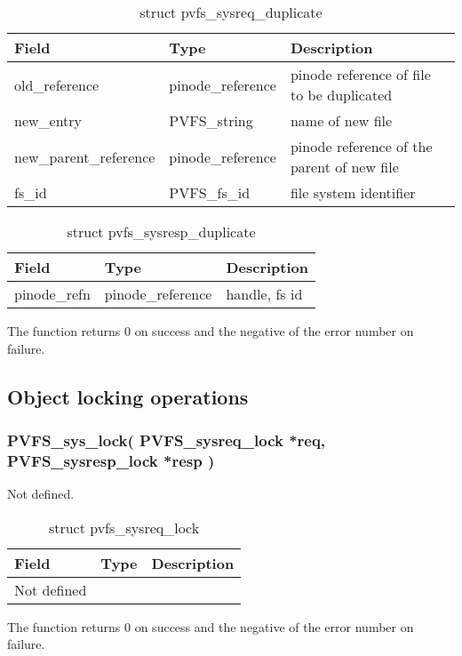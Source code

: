 \documentclass[11pt, letterpaper]{article}
\begin{document}
\begin{table}[H]
\begin{tabular}{|l|l|l|}
\hline
Field & Type & Description \\
\hline
\hline
old\_reference & pinode\_reference & pinode reference of file to be
duplicated \\
\hline
new\_entry & PVFS\_string & name of new file \\
\hline
new\_parent\_reference & pinode\_reference & pinode reference of the
parent of new file \\
\hline
fs\_id & PVFS\_fs\_id & file system identifier \\
\hline
\end{tabular}
\caption{struct pvfs\_sysreq\_duplicate}\label{tab:reqdup}
\end{table}

\begin{table}[H]
\begin{tabular}{|l|l|l|}
\hline
Field & Type & Description \\
\hline
\hline
pinode\_refn & pinode\_reference & handle, fs id \\
\hline
\end{tabular}
\caption{struct pvfs\_sysresp\_duplicate}\label{tab:respdup}
\end{table}

The function returns 0 on success and the negative of the error
number on failure.

\subsection{Object locking operations}

\subsubsection{PVFS\_sys\_lock(
PVFS\_sysreq\_lock *req,
PVFS\_sysresp\_lock *resp
)}

Not defined.

\begin{table}[H]
\begin{tabular}{|l|l|l|}
\hline
Field & Type & Description \\
\hline
\hline
Not defined & & \\
\hline
\end{tabular}
\caption{struct pvfs\_sysreq\_lock}\label{tab:reqlock}
\end{table}

The function returns 0 on success and the negative of the error
number on failure.
\end{document}
